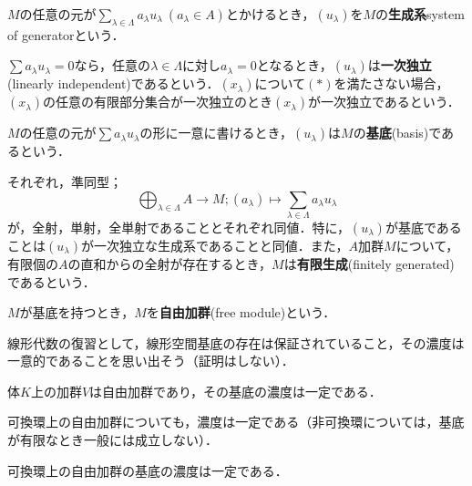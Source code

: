 \begin{defi}[生成系]
	$M$の任意の元が$\sum_{\lambda\in\Lambda}a_\lambda u_\lambda ~(a_\lambda\in A)$とかけるとき，$(u_\lambda)$を$M$の\textbf{生成系}{system of generator}という．
\end{defi}
\begin{defi}[一次独立]
	$\sum a_\lambda u_\lambda=0$なら，任意の$\lambda\in\Lambda$に対し$a_\lambda=0$となるとき，$(u_\lambda)$は\textbf{一次独立}(linearly independent)であるという．$(x_\lambda)$について$(\ast)$を満たさない場合，$(x_\lambda)$の任意の有限部分集合が一次独立のとき$(x_\lambda)$が一次独立であるという．
\end{defi}
\begin{defi}[基底]
	$M$の任意の元が$\sum a_\lambda u_\lambda$の形に一意に書けるとき，$(u_\lambda)$は$M$の\textbf{基底}(basis)であるという．	
\end{defi}

それぞれ，準同型；
\[\bigoplus_{\lambda\in\Lambda} A\to M;(a_\lambda)\mapsto\sum_{\lambda\in\Lambda} a_\lambda u_\lambda\]
が，全射，単射，全単射であることとそれぞれ同値．特に，$(u_\lambda)$が基底であることは$(u_\lambda)$が一次独立な生成系であることと同値．また，$A$加群$M$について，有限個の$A$の直和からの全射が存在するとき，$M$は\textbf{有限生成}(finitely generated)であるという．

\begin{defi}[自由加群]
	$M$が基底を持つとき，$M$を\textbf{自由加群}(free module)という．
\end{defi}

線形代数の復習として，線形空間基底の存在は保証されていること，その濃度は一意的であることを思い出そう（証明はしない）．
\begin{thm}
	体$K$上の加群$V$は自由加群であり，その基底の濃度は一定である．
\end{thm}

可換環上の自由加群についても，濃度は一定である（非可換環については，基底が有限なとき一般には成立しない）．

\begin{thm}\label{thm:可換環上の自由加群のrankは一定}
	可換環上の自由加群の基底の濃度は一定である．
\end{thm}

